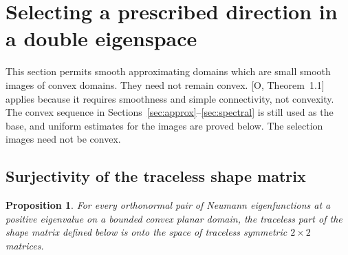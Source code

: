\documentclass[11pt]{article}
\newtheorem{proposition}[theorem]{Proposition}
\theoremstyle{definition}
\theoremstyle{remark}
\numberwithin{equation}{section}
\begin{document}
\section{Selecting a prescribed direction in a double eigenspace}\label{sec:double}
This section permits smooth approximating domains which are small smooth images of convex domains. They need not remain convex. [O, Theorem~1.1] applies because it requires smoothness and simple connectivity, not convexity. The convex sequence in Sections~\ref{sec:approx}--\ref{sec:spectral} is still used as the base, and uniform estimates for the images are proved below. The selection images need not be convex.

\subsection{Surjectivity of the traceless shape matrix}\label{subsec:11.1}
\begin{proposition}\label{prop:shape-surjective}
For every orthonormal pair of Neumann eigenfunctions at a positive eigenvalue on a bounded convex planar domain, the traceless part of the shape matrix defined below is onto the space of traceless symmetric $2\times2$ matrices.
\end{proposition}
\end{document}
